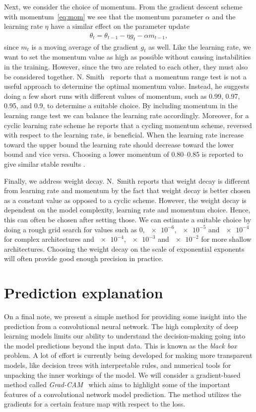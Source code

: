 Next, we consider the choice of momentum. From the gradient descent scheme with
momentum~\cref{eq:mom} we see that the momentum parameter $\alpha$ and the
learning rate $\eta$ have a similar effect on the parameter update
\begin{align*}
  \theta_t = \theta_{t-1} - \eta g_t - \alpha m_{t-1},
\end{align*}
since $m_t$ is a moving average of the gradient $g_t$ as well. Like the learning
rate, we want to set the momentum value as high as possible without causing
instabilities in the training. However, since the two are related to each other,
they must also be considered together. N. Smith~\cite{smith2018disciplined}
reports that a momentum range test is not a useful approach to determine the
optimal momentum value. Instead, he suggests doing a few short runs with different values of momentum,
such as 0.99, 0.97, 0.95, and 0.9, to determine a suitable choice. By including
momentum in the learning range test we can balance the learning rate accordingly. Moreover, for a cyclic learning rate scheme he reports that a cycling momentum scheme, reversed with respect to the learning rate, is beneficial. When the
learning rate increase toward the upper bound the learning rate should
decrease toward the lower bound and vice versa. Choosing a lower momentum of
0.80--0.85 is reported to give similar stable results \cite{smith2018disciplined}. 

Finally, we address weight decay. N.\ Smith \cite{smith2018disciplined} reports that weight decay is different from learning rate and momentum by the fact that weight decay is better chosen as a constant value as opposed to a cyclic scheme. However, the weight decay is dependent on the model complexity, learning rate and momentum choice. Hence, this can often be chosen after setting those. We can estimate a suitable choice by doing a rough grid search for values such as 0, $\num{e-6}$, $\num{e-5}$ and $\num{e-4}$ for complex architectures and $\num{e-4}$, $\num{e-3}$ and $\num{e-2}$ for more shallow architectures. Choosing the weight decay on the scale of exponential exponents will often provide good enough precision in practice. 


\section{Prediction explanation}\label{sec:explanation}
On a final note, we present a simple method for providing some insight into the prediction from a convolutional neural network. The high complexity of deep learning models limits our ability to understand the decision-making going into the model predictions beyond the input data. This is known as the \textit{black box} problem. A lot of effort is currently being developed for making more transparent models, like decision trees with interpretable rules, and numerical tools for unpacking the inner workings of the model. We will consider a gradient-based method called \textit{Grad-CAM}~\cite{Selvaraju_2019} which aims to highlight some of the important features of a convolutional network model prediction. The method utilizes the gradients for a certain feature map with respect to the loss. 


